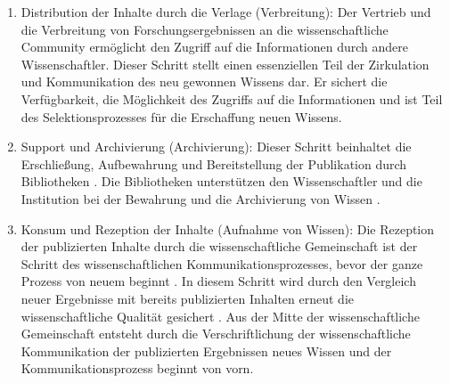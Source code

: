 \begin{enumerate}
\item Distribution der Inhalte durch die Verlage (Verbreitung):
Der Vertrieb und die Verbreitung von Forschungsergebnissen an die wissenschaftliche Community ermöglicht den Zugriff auf die Informationen durch andere Wissenschaftler. Dieser Schritt stellt einen essenziellen Teil der Zirkulation und Kommunikation des neu gewonnen Wissens dar\cite{cite:11i}. Er sichert die Verfügbarkeit, die Möglichkeit des Zugriffs auf die Informationen und ist Teil des Selektionsprozesses für die Erschaffung neuen Wissens.\cite{cite:11l}
\item Support und Archivierung (Archivierung): Dieser Schritt beinhaltet die Erschließung, Aufbewahrung und Bereitstellung der Publikation durch Bibliotheken \cite{schirmbacher_2009_wisspub}. Die Bibliotheken unterstützen den Wissenschaftler und die Institution bei der Bewahrung und die Archivierung von Wissen \cite{K_lbel_2002}.
\item Konsum und Rezeption der Inhalte (Aufnahme von Wissen): Die Rezeption der publizierten Inhalte durch die wissenschaftliche Gemeinschaft ist der  Schritt des wissenschaftlichen Kommunikationsprozesses, bevor der ganze Prozess von neuem beginnt \cite{schirmbacher_2009_wisspub}. In diesem Schritt wird durch den Vergleich neuer Ergebnisse mit bereits publizierten Inhalten erneut die wissenschaftliche Qualität gesichert \cite{umstatter_2007_qualitatssicherung}. Aus der Mitte der wissenschaftliche Gemeinschaft entsteht durch die Verschriftlichung der wissenschaftliche Kommunikation der publizierten Ergebnissen neues Wissen \cite{cite:11k} \cite{schirmbacher_2009_wisspub} und der Kommunikationsprozess beginnt von vorn.
\end{enumerate}

